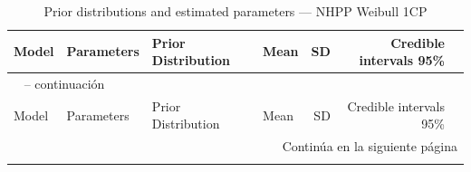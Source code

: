 \begin{longtable}{llllrrr}
\caption{Prior distributions and estimated parameters --- NHPP Weibull 1CP} \label{tab:nhpp_params_1cp} \\
\toprule
Model & Parameters & Prior Distribution & Mean & SD & Credible intervals 95\% \\
\midrule
\endfirsthead

\multicolumn{7}{l}{\tablename\ \thetable{} -- continuaci\'{o}n} \\
\toprule
Model & Parameters & Prior Distribution & Mean & SD & Credible intervals 95\% \\
\midrule
\endhead

\midrule
\multicolumn{7}{r}{Contin\'{u}a en la siguiente p\'{a}gina} \\
\endfoot

\bottomrule
\endlastfoot


\end{longtable}
